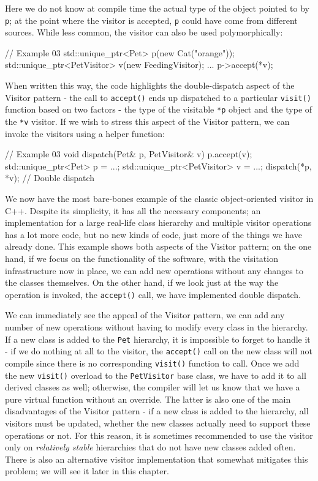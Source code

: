 Here we do not know at compile time the actual type of the object pointed to by \texttt{p}; at the point where the visitor is accepted, \texttt{p} could have come from different sources. While less common, the visitor can also be used polymorphically:

\begin{code}
// Example 03
std::unique_ptr<Pet> p(new Cat("orange"));
std::unique_ptr<PetVisitor> v(new FeedingVisitor);
...
p->accept(*v);
\end{code}

When written this way, the code highlights the double-dispatch aspect of the Visitor pattern - the call to \texttt{accept()} ends up dispatched to a particular \texttt{visit()} function based on two factors - the type of the visitable \texttt{*p} object and the type of the \texttt{*v} visitor. If we wish to stress this aspect of the Visitor pattern, we can invoke the visitors using a helper function:

\begin{code}
// Example 03
void dispatch(Pet& p, PetVisitor& v) { p.accept(v); }
std::unique_ptr<Pet> p = ...;
std::unique_ptr<PetVisitor> v = ...;
dispatch(*p, *v); // Double dispatch
\end{code}

We now have the most bare-bones example of the classic object-oriented visitor in C++. Despite its simplicity, it has all the necessary components; an implementation for a large real-life class hierarchy and multiple visitor operations has a lot more code, but no new kinds of code, just more of the things we have already done. This example shows both aspects of the Visitor pattern; on the one hand, if we focus on the functionality of the software, with the visitation infrastructure now in place, we can add new operations without any changes to the classes themselves. On the other hand, if we look just at the way the operation is invoked, the \texttt{accept()} call, we have implemented double dispatch.

We can immediately see the appeal of the Visitor pattern, we can add any number of new operations without having to modify every class in the hierarchy. If a new class is added to the \texttt{Pet} hierarchy, it is impossible to forget to handle it - if we do nothing at all to the visitor, the \texttt{accept()} call on the new class will not compile since there is no corresponding \texttt{visit()} function to call. Once we add the new \texttt{visit()} overload to the \texttt{PetVisitor} base class, we have to add it to all derived classes as well; otherwise, the compiler will let us know that we have a pure virtual function without an override. The latter is also one of the main disadvantages of the Visitor pattern - if a new class is added to the hierarchy, all visitors must be updated, whether the new classes actually need to support these operations or not. For this reason, it is sometimes recommended to use the visitor only on \emph{relatively stable} hierarchies that do not have new classes added often. There is also an alternative visitor implementation that somewhat mitigates this problem; we will see it later in this chapter.

